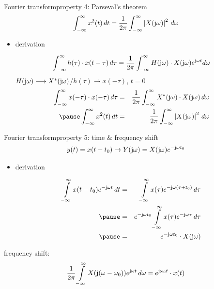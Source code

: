 	\begin{frame}{Fourier transform}{property 4: Parseval's theorem}
		\begin{equation*}
			\int_{-\infty}^{\infty}{x^2(t)\, dt} = \frac{1}{2\pi}\int_{-\infty}^{\infty} {\left|X(\mathrm{j}\omega)\right|^2\, d\omega} 
		\end{equation*}
		\pause
		\begin{itemize}
			\item[]	derivation
			\begin{footnotesize}
				\begin{equation*}
					\int_{-\infty}^{\infty}{h(\tau)\cdot x(t-\tau)\, d\tau} = \frac{1}{2\pi}\int_{-\infty}^{\infty} {H(\mathrm{j}\omega)\cdot X(\mathrm{j}\omega) {e}^{\mathrm{j}\omega t} d\omega}\nonumber
				\end{equation*}
				 \centering $H(\mathrm{j}\omega) \longrightarrow X^\ast (\mathrm{j}\omega)$/$h(\tau)\longrightarrow x(-\tau)$, $t = 0$
							\pause
				\begin{eqnarray*}
					\int_{-\infty}^{\infty}{x(-\tau)\cdot x(-\tau)\, d\tau} &=& \frac{1}{2\pi}\int_{-\infty}^{\infty} {X^\ast (\jom)\cdot X(\jom) \, d\omega}\nonumber\\
					\pause
					\int_{-\infty}^{\infty}{x^2(t)\, dt} &=& \frac{1}{2\pi}\int_{-\infty}^{\infty} {\left|X(\jom)\right|^2\, d\omega} \nonumber
				\end{eqnarray*}
			\end{footnotesize}
		\end{itemize}
	\end{frame}	

	\begin{frame}{Fourier transform}{property 5: time \& frequency shift}
		\begin{equation*}\label{eq:fft_timeshift}
			y(t) = x(t-t_0)\rightarrow Y(\mathrm{j}\omega) = X(\mathrm{j}\omega){e}^{-\mathrm{j}\omega t_0} 
		\end{equation*} 
		\pause
		\begin{itemize}
			\item[]	derivation
			\begin{footnotesize}
				\begin{eqnarray*}
					\int\limits_{-\infty}^{\infty} {x(t-t_0) \e^{-\jom t}\, dt} &=& \int\limits_{-\infty}^{\infty} {x(\tau) \e^{-\jom (\tau + t_0)}\, d\tau}\nonumber\\
					\pause
					&=& \e^{-\jom t_0}\int\limits_{-\infty}^{\infty} {x(\tau) \e^{-\jom \tau}\, d\tau}\nonumber\\
					\pause
					&=& \e^{-\jom t_0} \cdot X(\jom) \nonumber
				\end{eqnarray*}
			\end{footnotesize}
		\end{itemize}
		\pause
		frequency shift:
		\begin{equation*}
					\frac{1}{2\pi}\int\limits_{-\infty}^{\infty} X(\mathrm{j}(\omega-\omega_0)) {e}^{\mathrm{j}\omega t}\, d\omega = {e}^{\mathrm{j}\omega_0 t}\cdot x(t) 		
		\end{equation*} 

	\end{frame}	

